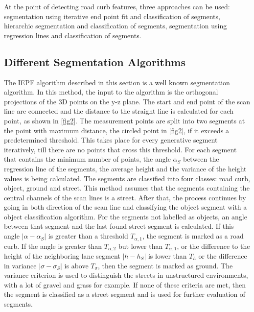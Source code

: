 At the point of detecting road curb features, three approaches can be used: segmentation using iterative end point fit and classification of segments, hierarchic segmentation and classification of segments, segmentation using regression lines and classification of segments.


\subsection{Different Segmentation Algorithms}

The IEPF algorithm described in this section is a well known segmentation algorithm. In this method, the input to the algorithm is the orthogonal projections of the 3D points on the y-z plane. The start and end point of the scan line are connected and the distance to the straight line is calculated for each point, as shown in \ref{fig2}. The measurement points are split into two segments at the point with maximum distance, the circled point in \ref{fig2}, if it exceeds a predetermined threshold. This takes place for every generative segment iteratively, till there are no points that cross this threshold. For each segment that contains the minimum number of points, the angle $\alpha_S$ between the regression line of the segments, the average height and the variance of the height values is being calculated. The segments are classified into four classes: road curb, object, ground and street. This method assumes that the segments containing the central channels of the scan lines is a street. After that, the process continues by going in both direction of the scan line and classifying the object segment with a object classification algorithm. For the segments not labelled as objects, an angle between that segment and the last found street segment is calculated. If this angle $|\alpha - \alpha_S|$ is greater than a threshold $T_{\alpha,1}$, the segment is marked as a road curb. If the angle is greater than $T_{\alpha,2}$ but lower than $T_{\alpha,1}$, or the difference to the height of the neighboring lane segment $|h - h_S|$ is lower than $T_h$ or the difference in variance $|\sigma - \sigma_S|$ is above $T_\sigma$, then the segment is marked as ground. The variance criterion is used to distinguish the streets in unstructured environments, with a lot of gravel and grass for example. If none of these criteria are met, then the segment is classified as a street segment and is used for further evaluation of segments. 

